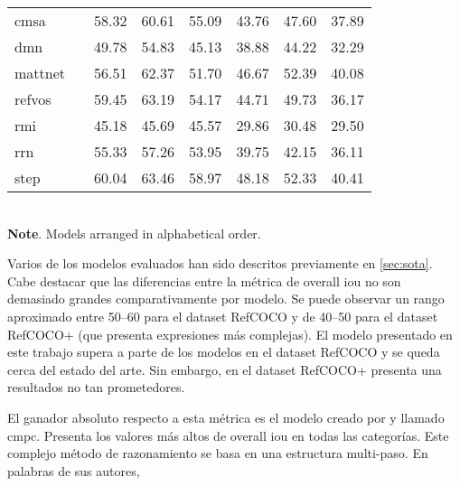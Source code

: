 \begin{table}[p]
\begin{tabular}{lc*6c}
    \acs{cmsa}      & \cite{ye21:refer_segmen_images_videos_cross}                 & 58.32          & 60.61          & 55.09          & 43.76          & 47.60          & 37.89          \\
    \acs{dmn}       & \cite{margffoy-tuay18:dynam_multim_instan_segmen}            & 49.78          & 54.83          & 45.13          & 38.88          & 44.22          & 32.29          \\
    \acs{mattnet}   & \cite{yu18:mattn}                                            & 56.51          & 62.37          & 51.70          & 46.67          & 52.39          & 40.08          \\
    \acs{refvos}    & \cite{bellver20:refvos}                                      & 59.45          & 63.19          & 54.17          & 44.71          & 49.73          & 36.17          \\
    \acs{rmi}       & \cite{liu17:recur_multim_inter_refer_image_segmen}           & 45.18          & 45.69          & 45.57          & 29.86          & 30.48          & 29.50          \\
    \acs{rrn}       & \cite{li18:refer_image_segmen_recur_refin_networ}            & 55.33          & 57.26          & 53.95          & 39.75          & 42.15          & 36.11          \\
    \acs{step}      & \cite{chen19:see_throug_text_group_refer_image_segmen}       & 60.04          & 63.46          & 58.97          & 48.18          & 52.33          & 40.41          \\
    \bottomrule
  \end{tabular}\\[1.25ex]
  {\small\textbf{Note}. Models arranged in alphabetical order.}
\end{table}

Varios de los modelos evaluados han sido descritos previamente en
\vref{sec:sota}. Cabe destacar que las diferencias entre la métrica de overall
\gls{iou} no son demasiado grandes comparativamente por modelo. Se puede
observar un rango aproximado entre 50--60 para el dataset RefCOCO y de 40--50
para el dataset RefCOCO+ (que presenta expresiones más complejas). El modelo
presentado en este trabajo supera a parte de los modelos en el dataset RefCOCO
y se queda cerca del estado del arte. Sin embargo, en el dataset RefCOCO+
presenta una resultados no tan prometedores.

El ganador absoluto respecto a esta métrica es el modelo creado por
 y llamado
\gls{cmpc}. Presenta los valores más altos de overall \gls{iou} en todas las
categorías. Este complejo método de razonamiento se basa en una estructura
multi-paso. En palabras de sus autores,

